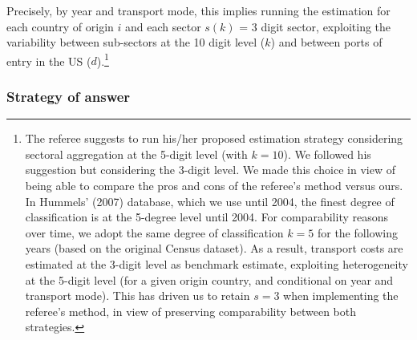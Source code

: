 \documentclass[a4paper,12pt]{article}
\begin{document}
Precisely, by year and transport mode, this implies running the estimation for each country of origin $i$ and each sector $s(k)$ = 3 digit sector, exploiting the variability between sub-sectors at the 10 digit level ($k$) and between ports of entry in the US ($d$).\footnote{The referee suggests to run his/her proposed estimation strategy considering sectoral aggregation at the 5-digit level (with $k=10$). We followed his suggestion but considering the 3-digit level. We made this choice in view of being able to compare the pros and cons of the referee's method versus ours. In Hummels' (2007) database, which we use until 2004, the finest degree of classification is at the 5-degree level until 2004. For comparability reasons over time, we adopt the same degree of classification $k=5$ for the following years (based on the original Census dataset). As a result, transport costs are estimated at the 3-digit level as benchmark estimate, exploiting heterogeneity at the 5-digit level (for a given origin country, and conditional on year and transport mode). This has driven us to retain $s=3$ when implementing the referee's method, in view of preserving comparability between both strategies.}

\subsubsection{Strategy of answer}
\end{document}
